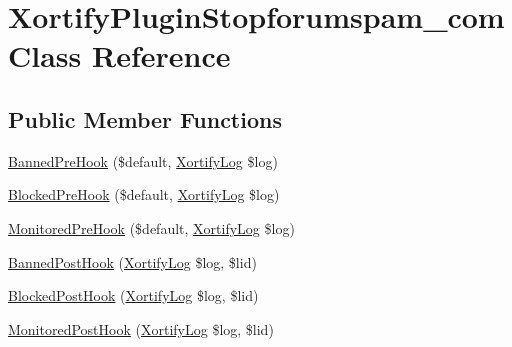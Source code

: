 \hypertarget{class_xortify_plugin_stopforumspam__com}{\section{Xortify\-Plugin\-Stopforumspam\-\_\-com Class Reference}
\label{class_xortify_plugin_stopforumspam__com}
}
\subsection*{Public Member Functions}
\begin{DoxyCompactItemize}
\item 
\hyperlink{class_xortify_plugin_stopforumspam__com_aacd0a27d3740aae83c03e921f6e58783}{Banned\-Pre\-Hook} (\$default, \hyperlink{class_xortify_log}{Xortify\-Log} \$log)
\item 
\hyperlink{class_xortify_plugin_stopforumspam__com_a1b0001df5cf5ef18a5181774ce16b089}{Blocked\-Pre\-Hook} (\$default, \hyperlink{class_xortify_log}{Xortify\-Log} \$log)
\item 
\hyperlink{class_xortify_plugin_stopforumspam__com_abbd4e782a10042ec86d3bef94daad89a}{Monitored\-Pre\-Hook} (\$default, \hyperlink{class_xortify_log}{Xortify\-Log} \$log)
\item 
\hyperlink{class_xortify_plugin_stopforumspam__com_a6bc03033f17c2fcede4d020d1cfbcc48}{Banned\-Post\-Hook} (\hyperlink{class_xortify_log}{Xortify\-Log} \$log, \$lid)
\item 
\hyperlink{class_xortify_plugin_stopforumspam__com_a1cb2408e6422326482b2e8eb45d2d0c1}{Blocked\-Post\-Hook} (\hyperlink{class_xortify_log}{Xortify\-Log} \$log, \$lid)
\item 
\hyperlink{class_xortify_plugin_stopforumspam__com_aa4a3d909c3769e0c3c7b6488f8659a1d}{Monitored\-Post\-Hook} (\hyperlink{class_xortify_log}{Xortify\-Log} \$log, \$lid)
\end{DoxyCompactItemize}


